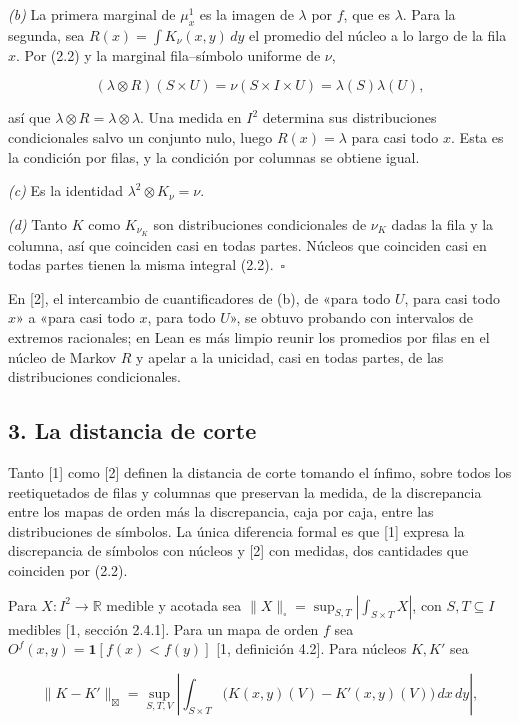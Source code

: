 \documentclass[spanish,11pt,a4paper]{article}
\begin{document}
\emph{(b)} La primera marginal de \(\mu^1_x\) es la imagen de \(\lambda\) por \(f\), que es \(\lambda\). Para la segunda, sea \(R(x)=\int K_\nu(x,y)\,dy\) el promedio del núcleo a lo largo de la fila \(x\). Por (2.2) y la marginal fila--símbolo uniforme de \(\nu\),

\nopagebreak[4]
\[(\lambda\otimes R)(S\times U)=\nu(S\times I\times U)=\lambda(S)\lambda(U),\]

así que \(\lambda\otimes R=\lambda\otimes\lambda\). Una medida en \(I^2\) determina sus distribuciones condicionales salvo un conjunto nulo, luego \(R(x)=\lambda\) para casi todo \(x\). Esta es la condición por filas, y la condición por columnas se obtiene igual.

\emph{(c)} Es la identidad \(\lambda^2\otimes K_\nu=\nu\).

\emph{(d)} Tanto \(K\) como \(K_{\nu_K}\) son distribuciones condicionales de \(\nu_K\) dadas la fila y la columna, así que coinciden casi en todas partes. Núcleos que coinciden casi en todas partes tienen la misma integral (2.2).~\(\square\)

En {[}2{]}, el intercambio de cuantificadores de (b), de «para todo \(U\), para casi todo \(x\)» a «para casi todo \(x\), para todo \(U\)», se obtuvo probando con intervalos de extremos racionales; en Lean es más limpio reunir los promedios por filas en el núcleo de Markov \(R\) y apelar a la unicidad, casi en todas partes, de las distribuciones condicionales.

\subsection{3. La distancia de corte}\label{la-distancia-de-corte}

Tanto {[}1{]} como {[}2{]} definen la distancia de corte tomando el ínfimo, sobre todos los reetiquetados de filas y columnas que preservan la medida, de la discrepancia entre los mapas de orden más la discrepancia, caja por caja, entre las distribuciones de símbolos. La única diferencia formal es que {[}1{]} expresa la discrepancia de símbolos con núcleos y {[}2{]} con medidas, dos cantidades que coinciden por (2.2).

Para \(X:I^2\to\mathbb R\) medible y acotada sea \(\|X\|_\square=\sup_{S,T}|\int_{S\times T}X|\), con \(S,T\subseteq I\) medibles {[}1, sección 2.4.1{]}. Para un mapa de orden \(f\) sea \(O^f(x,y)=\mathbf 1[f(x)<f(y)]\) {[}1, definición 4.2{]}. Para núcleos \(K,K'\) sea

\nopagebreak[4]
\[\|K-K'\|_{\boxtimes}=\sup_{S,T,V}\left|\int_{S\times T}\bigl(K(x,y)(V)-K'(x,y)(V)\bigr)\,dx\,dy\right|,\tag{3.1}\]
\end{document}
